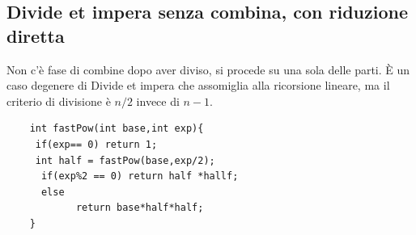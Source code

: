 \subsection{Divide et impera senza combina, con riduzione diretta}
Non c'è fase di combine  dopo aver diviso, si procede su una sola delle parti. È un caso degenere di Divide et impera che assomiglia alla ricorsione lineare, ma il criterio di divisione è $n/2$ invece di $ n-1$.

\begin{codeexample}

    \begin{codebox}
    \begin{lstlisting}
    int fastPow(int base,int exp){
     if(exp== 0) return 1; 
     int half = fastPow(base,exp/2);
      if(exp%2 == 0) return half *hallf;
      else
            return base*half*half;
    }
    \end{lstlisting}
    \end{codebox}
\end{codeexample}

